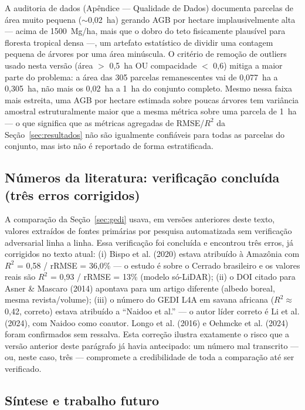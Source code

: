 A auditoria de dados (Apêndice --- Qualidade de Dados) documenta parcelas de área
muito pequena ($\sim$0,02~ha) gerando AGB por hectare implausivelmente alta ---
acima de 1500~Mg/ha, mais que o dobro do teto fisicamente plausível para floresta
tropical densa ---, um artefato estatístico de dividir uma contagem pequena de
árvores por uma área minúscula. O critério de remoção de outliers usado nesta
versão (área $>$ 0,5~ha OU compacidade $<$ 0,6) mitiga a maior parte do problema: a
área das 305 parcelas remanescentes vai de 0,077~ha a 0,305~ha, não mais os
0,02~ha a 1~ha do conjunto completo. Mesmo nessa faixa mais estreita, uma AGB por
hectare estimada sobre poucas árvores tem variância amostral estruturalmente maior
que a mesma métrica sobre uma parcela de 1~ha --- o que significa que as métricas
agregadas de RMSE/$R^2$ da Seção~\ref{sec:resultados} não são igualmente
confiáveis para todas as parcelas do conjunto, mas isto não é reportado de forma
estratificada.

\subsection{Números da literatura: verificação concluída (três erros corrigidos)}
\label{sec:lit-check}

A comparação da Seção~\ref{sec:gedi} usava, em versões anteriores deste texto,
valores extraídos de fontes primárias por pesquisa automatizada sem verificação
adversarial linha a linha. Essa verificação foi concluída e encontrou três erros,
já corrigidos no texto atual: (i) Bispo et al. (2020) estava atribuído à Amazônia
com $R^2$ = 0,58 / rRMSE = 36,0\% --- o estudo é sobre o Cerrado brasileiro e os
valores reais são $R^2$ = 0,93 / rRMSE = 13\% (modelo só-LiDAR); (ii) o DOI citado
para Asner \& Mascaro (2014) apontava para um artigo diferente (albedo boreal,
mesma revista/volume); (iii) o número do GEDI L4A em savana africana
($R^2 \approx$ 0,42, correto) estava atribuído a ``Naidoo et al.'' --- o autor
líder correto é Li et al. (2024), com Naidoo como coautor. Longo et al. (2016) e
Oehmcke et al. (2024) foram confirmados sem ressalva. Esta correção ilustra
exatamente o risco que a versão anterior deste parágrafo já havia antecipado: um
número mal transcrito --- ou, neste caso, três --- compromete a credibilidade de
toda a comparação até ser verificado.

\subsection{Síntese e trabalho futuro}


